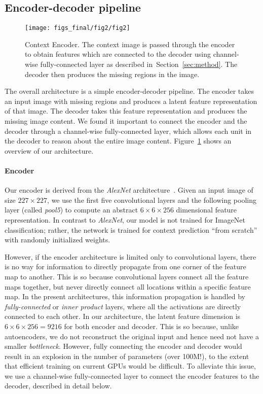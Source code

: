 \documentclass[10pt,twocolumn,letterpaper]{article}
\newcommand{\reffig}[1]{Figure~\ref{fig:#1}}
\newcommand{\refsec}[1]{Section~\ref{sec:#1}}
\newcommand{\lblfig}[1]{\label{fig:#1}}
\newcommand{\lblsec}[1]{\label{sec:#1}}
\begin{document}
\subsection{Encoder-decoder pipeline}
\begin{figure}[t]
\texttt{[image: figs\_final/fig2/fig2]}
\vspace{-0.5em}
\caption{Context Encoder. The context image is passed through the encoder to obtain features which are connected to the decoder using channel-wise fully-connected layer as described in~\refsec{method}. The decoder then produces the missing regions in the image.}
\lblfig{concept}
\vspace{-0.5em}
\end{figure}
\lblsec{method}
The overall architecture is a simple encoder-decoder pipeline.
The encoder takes an input image with missing regions and produces a latent feature representation of that image.
The decoder takes this feature representation and produces the missing image content.
We found it important to connect the encoder and the decoder through a channel-wise fully-connected layer, which allows each unit in the decoder to reason about the entire image content.
\reffig{concept} shows an overview of our architecture.

\paragraph{Encoder}
Our encoder is derived from the \textit{AlexNet} architecture~\cite{krizhevsky2012imagenet}.
Given an input image of size $227\times 227$, we use the first five convolutional layers and the following pooling layer (called \textit{pool5}) to compute an abstract $6 \times 6 \times 256$ dimensional feature representation.
In contrast to \textit{AlexNet}, our model is not trained for ImageNet classification; rather, the network is trained for context prediction ``from scratch'' with randomly initialized weights.


However, if the encoder architecture is limited only to convolutional layers, there is no way for information to directly propagate from one corner of the feature map to another.
This is so because convolutional layers connect all the feature maps together, but never directly connect all locations within a specific feature map.
In the present architectures, this information propagation is handled by \textit{fully-connected} or \textit{inner product} layers, where all the activations are directly connected to each other.
In our architecture, the latent feature dimension is $6\times 6 \times 256 = 9216$ for both encoder and decoder.
This is so because, unlike autoencoders, we do not reconstruct the original input and hence need not have a smaller \textit{bottleneck}.
However, fully connecting the encoder and decoder would result in an explosion in the number of parameters (over 100M!), to the extent that efficient training on current GPUs would be difficult.
To alleviate this issue, we use a channel-wise fully-connected layer to connect the encoder features to the decoder, described in detail below.
\end{document}
